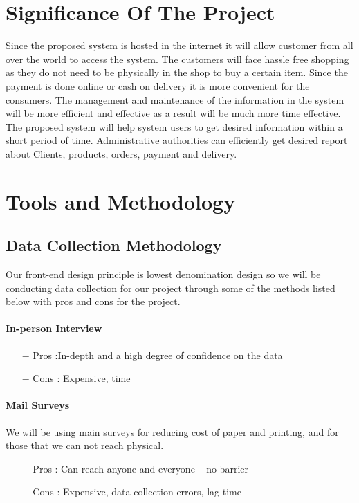 \section{Significance Of The Project}
Since the proposed system is hosted in the internet it will allow customer from all over the world to access the system. The customers will face hassle free shopping as they do not need to be physically in the shop to buy a certain item. Since the payment is done online or cash on delivery it is more convenient for the consumers. The management and maintenance of the information in the system will be more efficient and effective as a result will be much more time effective. The proposed system will help system users to get
desired information within a short period of time. Administrative authorities can efficiently get desired report about Clients, products, orders, payment and delivery.

\section{Tools and Methodology}
\subsection{Data Collection Methodology} 
Our front-end design principle is lowest denomination design so we will be conducting data collection for our project through some of the methods listed below with pros and cons for the project.

\paragraph{In-person Interview}

\begin{itemize}
    \item[$-$] Pros :In-depth and a high degree of confidence on the data
    \item[$-$] Cons : Expensive, time
\end{itemize}

\paragraph{Mail Surveys}
We will be using main surveys for reducing cost of paper and printing, and for those that we can not reach physical.
\begin{itemize}
    \item[$-$] Pros : Can reach anyone and everyone – no barrier
    \item[$-$] Cons : Expensive, data collection errors, lag time
\end{itemize}

